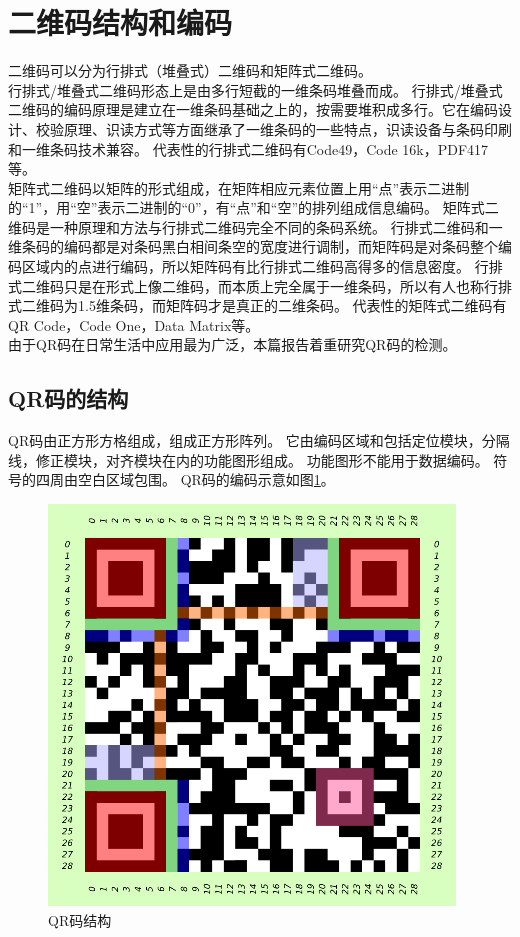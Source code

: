 \section{二维码结构和编码}
二维码可以分为行排式（堆叠式）二维码和矩阵式二维码。\\
行排式/堆叠式二维码形态上是由多行短截的一维条码堆叠而成。
行排式/堆叠式二维码的编码原理是建立在一维条码基础之上的，按需要堆积成多行。它在编码设计、校验原理、识读方式等方面继承了一维条码的一些特点，识读设备与条码印刷和一维条码技术兼容。
代表性的行排式二维码有Code49，Code 16k，PDF417等。\\
矩阵式二维码以矩阵的形式组成，在矩阵相应元素位置上用“点”表示二进制的“1”，用“空”表示二进制的“0”，有“点”和“空”的排列组成信息编码。
矩阵式二维码是一种原理和方法与行排式二维码完全不同的条码系统。
行排式二维码和一维条码的编码都是对条码黑白相间条空的宽度进行调制，而矩阵码是对条码整个编码区域内的点进行编码，所以矩阵码有比行排式二维码高得多的信息密度。
行排式二维码只是在形式上像二维码，而本质上完全属于一维条码，所以有人也称行排式二维码为1.5维条码，而矩阵码才是真正的二维条码。
代表性的矩阵式二维码有QR Code，Code One，Data Matrix等。\\
由于QR码在日常生活中应用最为广泛，本篇报告着重研究QR码的检测。

\subsection{QR码的结构}
QR码由正方形方格组成，组成正方形阵列。
它由编码区域和包括定位模块，分隔线，修正模块，对齐模块在内的功能图形组成。
功能图形不能用于数据编码。
符号的四周由空白区域包围。
QR码的编码示意如图\ref{fig:structure1}。

\begin{figure}[h]
\centering
\includegraphics[width=0.9\linewidth]{structure1}
\caption[QR码结构]{QR码结构}
\label{fig:structure1}
\end{figure}

